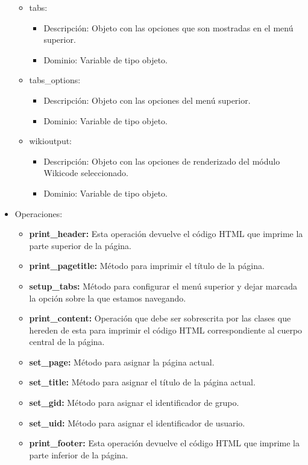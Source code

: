 \begin{itemize}
\begin{itemize}
			\item tabs:
				\begin{itemize}
					\item Descripción: Objeto con las opciones que son mostradas en el menú superior.
					\item Dominio: Variable de tipo objeto.
				\end{itemize}
			\item tabs\_options:
				\begin{itemize}
					\item Descripción: Objeto con las opciones del menú superior.
					\item Dominio: Variable de tipo objeto.
				\end{itemize}
			\item wikioutput:
				\begin{itemize}
					\item Descripción: Objeto con las opciones de renderizado del módulo Wikicode seleccionado.
					\item Dominio: Variable de tipo objeto.
				\end{itemize}
		\end{itemize}
	\item Operaciones:
		\begin{itemize}
			\item \textbf{print\_header: }Esta operación devuelve el código HTML que imprime la parte superior de la página.
			\item \textbf{print\_pagetitle: }Método para imprimir el título de la página.
			\item \textbf{setup\_tabs: }Método para configurar el menú superior y dejar marcada la opción sobre la que estamos navegando.
			\item \textbf{print\_content: }Operación que debe ser sobrescrita por las clases que hereden de esta para imprimir el código HTML correspondiente al cuerpo central de la página.
			\item \textbf{set\_page: }Método para asignar la página actual.
			\item \textbf{set\_title: }Método para asignar el título de la página actual.
			\item \textbf{set\_gid: }Método para asignar el identificador de grupo.
			\item \textbf{set\_uid: }Método para asignar el identificador de usuario.
			\item \textbf{print\_footer: }Esta operación devuelve el código HTML que imprime la parte inferior de la página.

\end{itemize}
\end{itemize}
